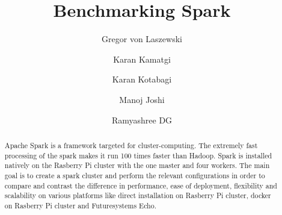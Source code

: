 \title{Benchmarking Spark}

\author{Gregor von Laszewski}

\author{Karan Kamatgi}

\author{Karan Kotabagi}

\author{Manoj Joshi}

\author{Ramyashree DG}

\renewcommand{\shortauthors}{G. v. Laszewski, Karan Kamatgi, 
  Karan Kotabagi, Manoj Joshi, Ramyashree DG}


\begin{abstract}
Apache Spark is a framework targeted for cluster-computing. 
The extremely fast processing of the spark makes it run 100 times
faster than Hadoop. Spark is installed natively on the 
Rasberry Pi cluster with the one master and four workers. 
The main goal is to create a spark cluster and perform the 
relevant configurations in order to compare and contrast 
the difference in performance, ease of deployment, flexibility 
and scalability on various platforms like direct installation 
on Rasberry Pi cluster, docker on Rasberry Pi 
cluster and Futuresystems Echo.
\end{abstract}


\maketitle


